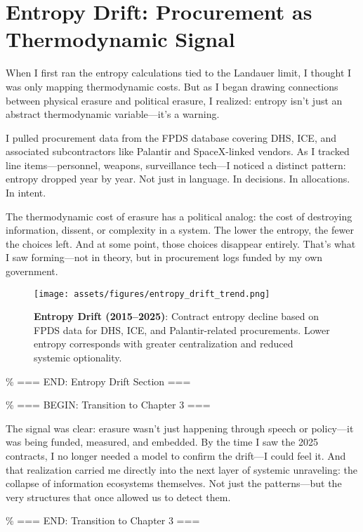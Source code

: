 \section*{Entropy Drift: Procurement as Thermodynamic Signal}

When I first ran the entropy calculations tied to the Landauer limit, I
thought I was only mapping thermodynamic costs. But as I began drawing
connections between physical erasure and political erasure, I realized:
entropy isn't just an abstract thermodynamic variable---it's a warning.

I pulled procurement data from the FPDS database covering DHS, ICE, and
associated subcontractors like Palantir and SpaceX-linked vendors. As I
tracked line items---personnel, weapons, surveillance tech---I noticed a
distinct pattern: entropy dropped year by year. Not just in language. In
decisions. In allocations. In intent.

The thermodynamic cost of erasure has a political analog: the cost of
destroying information, dissent, or complexity in a system. The lower
the entropy, the fewer the choices left. And at some point, those
choices disappear entirely. That's what I saw forming---not in theory,
but in procurement logs funded by my own government.

\begin{figure}[H]
  \centering
  \texttt{[image: assets/figures/entropy\_drift\_trend.png]}
  \caption{\textbf{Entropy Drift (2015–2025)}: Contract entropy decline based on FPDS data for DHS, ICE, and Palantir-related procurements. Lower entropy corresponds with greater centralization and reduced systemic optionality.}
  \label{fig:entropy_drift}
\end{figure}

\% === END: Entropy Drift Section ===

\% === BEGIN: Transition to Chapter 3 ===

The signal was clear: erasure wasn't just happening through speech or
policy---it was being funded, measured, and embedded. By the time I saw
the 2025 contracts, I no longer needed a model to confirm the drift---I
could feel it. And that realization carried me directly into the next
layer of systemic unraveling: the collapse of information ecosystems
themselves. Not just the patterns---but the very structures that once
allowed us to detect them.

\% === END: Transition to Chapter 3 ===
